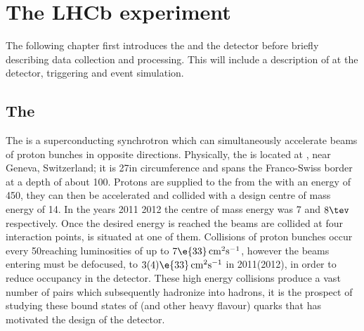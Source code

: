 \chapter{The LHCb experiment}
\label{ch:lhcb}

The following chapter first introduces the \lhc and the \lhcb detector before briefly
describing data collection and processing.
This will include a description of \pid at the \lhcb detector, triggering and event simulation.



\section{The \lhc}
The \lhc is a superconducting synchrotron which can simultaneously accelerate beams of proton bunches
in opposite directions.
Physically, the \lhc is located at \cern, near Geneva, Switzerland; it is 27\km in
circumference and spans the Franco-Swiss border at a depth of about 100\m.
Protons are supplied to the \lhc from the \sps with an energy of 450\gev, they can then
be accelerated and collided with a design centre of mass energy of 14\tev.
In the years 2011 2012 the centre of mass energy was 7 and $8\tev$ respectively.
Once the desired energy is reached the beams are collided at four interaction points, \lhcb is
situated at one of them.
Collisions of proton bunches occur every 50\ns reaching luminosities of up to
$7\e{33}\,\mathrm{cm}^{2}\mathrm{s}^{-1}$, however the beams entering \lhcb must be defocused, to
$3(4)\e{33}\,\mathrm{cm}^{2}\mathrm{s}^{-1}$ in 2011(2012), in order to reduce occupancy in the
\lhcb detector.
These high energy collisions produce a vast number of \bbbar pairs which subsequently hadronize
into \bquark hadrons, it is the prospect of studying these bound states of \bquark (and other heavy
flavour) quarks that has motivated the design of the \lhcb detector.





